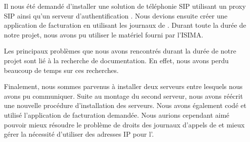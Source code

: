 
Il nous été demandé d'installer une solution de téléphonie SIP utilisant un proxy SIP {\kam} ainsi qu'un serveur d'authentification {\rad} {\frad}. Nous devions ensuite créer une application de facturation en utilisant les journaux de {\frad}. Durant toute la durée de notre projet, nous avons pu utiliser le matériel fourni par l'ISIMA.

Les principaux problèmes que nous avons rencontrés durant la durée de notre projet sont lié à la recherche de documentation. En effet, nous avons perdu beaucoup de temps sur ces recherches. 

Finalement, nous sommes parvenus à installer deux serveurs entre lesquels nous avons pu communiquer. Suite au montage du second serveur, nous avons réécrit une nouvelle procédure d'installation des serveurs.  
Nous avons également codé et utilisé l'application de facturation demandée.
Nous aurions cependant aimé pouvoir mieux résoudre le problème de droits des journaux d'appels de {\frad} et mieux gérer la nécessité d'utiliser des adresses IP pour l'{\ata}.

